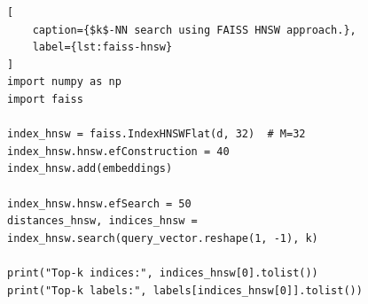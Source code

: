 \begin{lstlisting}[
    caption={$k$-NN search using FAISS HNSW approach.},
    label={lst:faiss-hnsw}
]
import numpy as np
import faiss

index_hnsw = faiss.IndexHNSWFlat(d, 32)  # M=32
index_hnsw.hnsw.efConstruction = 40
index_hnsw.add(embeddings)

index_hnsw.hnsw.efSearch = 50
distances_hnsw, indices_hnsw = index_hnsw.search(query_vector.reshape(1, -1), k)

print("Top-k indices:", indices_hnsw[0].tolist())
print("Top-k labels:", labels[indices_hnsw[0]].tolist())
\end{lstlisting}